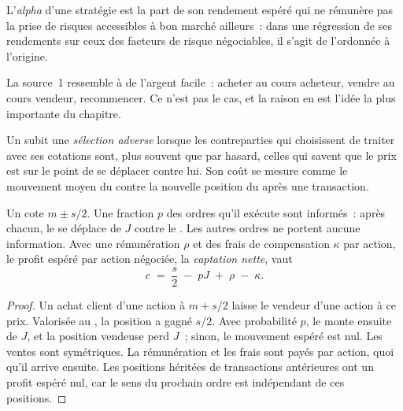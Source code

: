 \begin{definition}[Alpha]\label{def:m1:what-a-trading-firm-does:alpha}
L'\emph{alpha} d'une stratégie est la part de son rendement espéré
qui ne rémunère pas la prise de risques accessibles à bon marché
ailleurs~: dans une régression de ses rendements sur ceux des facteurs de
risque négociables, il s'agit de l'ordonnée à l'origine.
\end{definition}

La source~1 ressemble à de l'argent facile~: acheter au cours acheteur, vendre au cours vendeur, recommencer. Ce
n'est pas le cas, et la raison en est l'idée la plus importante du chapitre.

\begin{definition}\label{def:m1:what-a-trading-firm-does:adverse-selection}
Un  subit une \emph{sélection adverse}
lorsque les contreparties qui choisissent de traiter avec ses cotations sont, plus
souvent que par hasard, celles qui savent que le prix est sur le point de se déplacer contre lui. Son coût
se mesure comme le mouvement moyen du  contre la nouvelle position
du  après une transaction.
\end{definition}

\begin{proposition}\label{prop:m1:what-a-trading-firm-does:capture}
Un  cote $m \pm s/2$. Une fraction $p$ des ordres qu'il exécute sont
informés~: après chacun, le  se déplace de $J$ contre le .
Les autres ordres ne portent aucune information. Avec une rémunération $\rho$ et des frais
de compensation $\kappa$ par action, le profit espéré par action négociée, la
\emph{captation nette}, vaut
\[
c \;=\; \frac{s}{2} \;-\; pJ \;+\; \rho \;-\; \kappa .
\]
\end{proposition}
\begin{proof}
Un achat client d'une action à $m + s/2$ laisse le  vendeur
d'une action à ce prix. Valorisée au , la position a gagné $s/2$. Avec
probabilité $p$, le  monte ensuite de $J$, et la position vendeuse perd $J$~; sinon,
le mouvement espéré est nul. Les ventes sont symétriques. La rémunération et les frais sont
payés par action, quoi qu'il arrive ensuite. Les positions héritées de transactions antérieures ont un
profit espéré nul, car le sens du prochain ordre est indépendant de
ces positions.
\end{proof}

